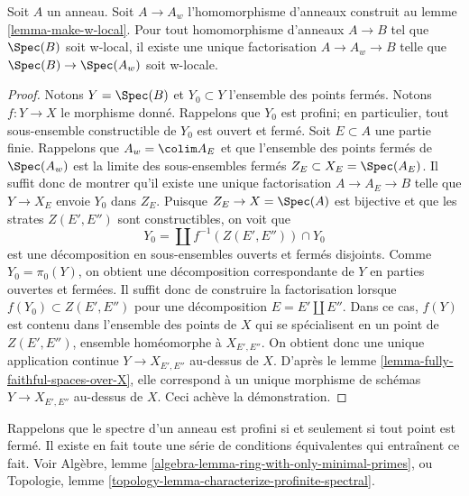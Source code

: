 \begin{lemma}
\label{lemma-universal}
Soit $A$ un anneau. Soit $A \to A_w$ l'homomorphisme d'anneaux construit au
lemme \ref{lemma-make-w-local}. Pour tout homomorphisme d'anneaux $A \to B$ tel que
$\Spec(B)$ soit w-local, il existe une unique factorisation $A \to A_w \to B$
telle que $\Spec(B) \to \Spec(A_w)$ soit w-locale.
\end{lemma}

\begin{proof}
Notons $Y = \Spec(B)$ et $Y_0 \subset Y$ l'ensemble des points ferm\'es.
Notons $f : Y \to X$ le morphisme donn\'e.
Rappelons que $Y_0$ est profini; en particulier, tout sous-ensemble constructible
de $Y_0$ est ouvert et ferm\'e. Soit $E \subset A$ une partie finie.
Rappelons que $A_w = \colim A_E$ et que l'ensemble des points ferm\'es de
$\Spec(A_w)$ est la limite des sous-ensembles ferm\'es $Z_E \subset X_E = \Spec(A_E)$.
Il suffit donc de montrer qu'il existe une unique factorisation $A \to A_E \to B$
telle que $Y \to X_E$ envoie $Y_0$ dans $Z_E$.
Puisque $Z_E \to X = \Spec(A)$ est bijective et que les strates
$Z(E', E'')$ sont constructibles, on voit que
$$
Y_0 = \coprod f^{-1}(Z(E', E'')) \cap Y_0
$$
est une d\'ecomposition en sous-ensembles ouverts et ferm\'es disjoints.
Comme $Y_0 = \pi_0(Y)$, on obtient une d\'ecomposition correspondante de
$Y$ en parties ouvertes et ferm\'ees. Il suffit donc de construire
la factorisation lorsque $f(Y_0) \subset Z(E', E'')$ pour
une d\'ecomposition $E = E' \amalg E''$.
Dans ce cas, $f(Y)$ est contenu dans l'ensemble des points de $X$
qui se sp\'ecialisent en un point de $Z(E', E'')$, ensemble hom\'eomorphe \`a $X_{E', E''}$.
On obtient donc une unique application continue $Y \to X_{E', E''}$ au-dessus de $X$. D'apr\`es le
lemme \ref{lemma-fully-faithful-spaces-over-X},
elle correspond \`a un unique morphisme de sch\'emas
$Y \to X_{E', E''}$ au-dessus de $X$. Ceci ach\`eve la d\'emonstration.
\end{proof}

\noindent
Rappelons que le spectre d'un anneau est profini si et seulement si
tout point est ferm\'e. Il existe en fait toute une s\'erie de conditions
\'equivalentes qui entra\^inent ce fait. Voir
Alg\`ebre, lemme \ref{algebra-lemma-ring-with-only-minimal-primes}, ou
Topologie, lemme \ref{topology-lemma-characterize-profinite-spectral}.

